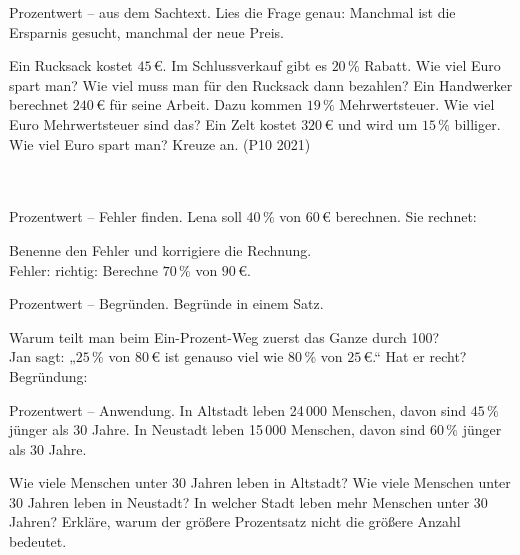 \begin{aufgabe}{Prozentwert – aus dem Sachtext. Lies die Frage genau: Manchmal ist die Ersparnis gesucht, manchmal der neue Preis.}
\begin{teile}
\teil Ein Rucksack kostet $45\,€$. Im Schlussverkauf gibt es $20\,\%$ Rabatt. Wie viel Euro spart man? \leerfeld[€]
\teil Wie viel muss man für den Rucksack dann bezahlen? \leerfeld[€]
\teil Ein Handwerker berechnet $240\,€$ für seine Arbeit. Dazu kommen $19\,\%$ Mehrwertsteuer. Wie viel Euro Mehrwertsteuer sind das? \leerfeld[€]
\teil Ein Zelt kostet $320\,€$ und wird um $15\,\%$ billiger. Wie viel Euro spart man? Kreuze an. \hfill (P10 2021) \\
\\
\\
\end{teile}
\end{aufgabe}

\begin{aufgabe}{Prozentwert – Fehler finden. Lena soll $40\,\%$ von $60\,€$ berechnen. Sie rechnet:}
\begin{teile}
\teil Benenne den Fehler und korrigiere die Rechnung. \\ Fehler: \dsleer\dsleer\dsleer \quad richtig: \leerfeld[€]
\teil Berechne $70\,\%$ von $90\,€$. \leerfeld[€]
\end{teile}
\end{aufgabe}

\begin{aufgabe}{Prozentwert – Begründen. Begründe in einem Satz.}
\begin{teile}
\teil Warum teilt man beim Ein-Prozent-Weg zuerst das Ganze durch 100? \\ \dsleer\dsleer\dsleer\dsleer
\teil Jan sagt: „$25\,\%$ von $80\,€$ ist genauso viel wie $80\,\%$ von $25\,€$.“ Hat er recht? \janein \\ Begründung: \dsleer\dsleer\dsleer\dsleer
\end{teile}
\end{aufgabe}

\begin{aufgabe}{Prozentwert – Anwendung. In Altstadt leben 24\,000 Menschen, davon sind $45\,\%$ jünger als 30 Jahre. In Neustadt leben 15\,000 Menschen, davon sind $60\,\%$ jünger als 30 Jahre.}
\begin{teile}
\teil Wie viele Menschen unter 30 Jahren leben in Altstadt? \leerfeld
\teil Wie viele Menschen unter 30 Jahren leben in Neustadt? \leerfeld
\teil In welcher Stadt leben mehr Menschen unter 30 Jahren? Erkläre, warum der größere Prozentsatz nicht die größere Anzahl bedeutet. \\ \dsleer\dsleer\dsleer\dsleer\dsleer
\end{teile}
\end{aufgabe}
